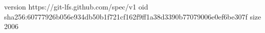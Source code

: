 version https://git-lfs.github.com/spec/v1
oid sha256:60777926b056e934db50b1f721cf162f9ff1a38d3390b77079006e0ef6be307f
size 2006

